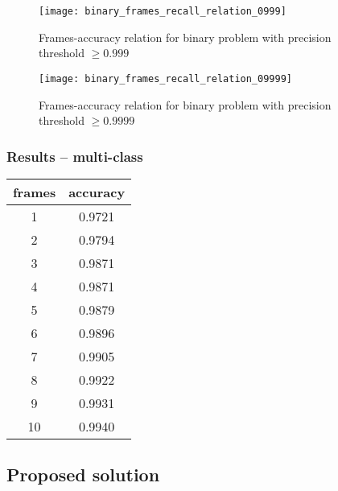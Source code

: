     \begin{figure}[H]
    \caption{Frames-accuracy relation for binary problem with precision threshold $\geqslant 0.999$}
    \centering
    \texttt{[image: binary\_frames\_recall\_relation\_0999]}
    \end{figure}

    \begin{figure}[H]
    \caption{Frames-accuracy relation for binary problem with precision threshold $\geqslant 0.9999$}
    \centering
    \texttt{[image: binary\_frames\_recall\_relation\_09999]}
    \end{figure}

    \subsubsection{Results -- multi-class}

    \begin{center}
    \small
        \begin{tabular}{ |c|c| }
        \hline
        frames & accuracy\\
        \hline
        1 & 0.9721\\
        \hline
        2 & 0.9794\\
        \hline
        3 & 0.9871\\
        \hline
        4 & 0.9871\\
        \hline
        5 & 0.9879\\
        \hline
        6 & 0.9896\\
        \hline
        7 & 0.9905\\
        \hline
        8 & 0.9922\\
        \hline
        9 & 0.9931\\
        \hline
        10 & 0.9940\\
        \hline
        \end{tabular}
    \end{center}


    \subsection{Proposed solution}
